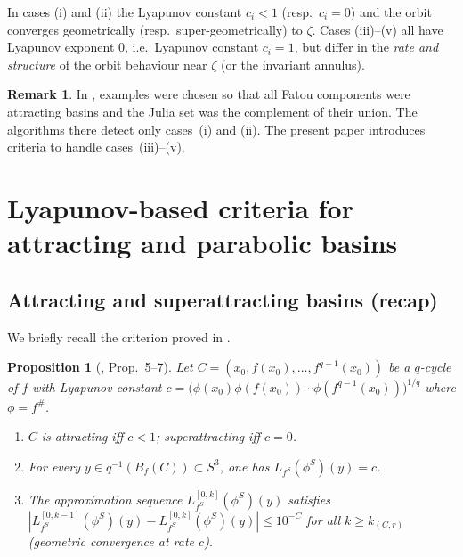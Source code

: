 \documentclass[12pt]{article}
\newtheorem{proposition}[theorem]{Proposition}
\theoremstyle{definition}
\newtheorem{remark}[theorem]{Remark}
\newcommand{\fsh}{f^{\#}}            %
\begin{document}
In cases (i) and (ii) the Lyapunov constant $c_i < 1$ (resp.~$c_i = 0$)
and the orbit converges geometrically (resp.~super-geometrically) to
$\zeta$.  Cases (iii)--(v) all have Lyapunov exponent $0$, i.e.~Lyapunov
constant $c_i = 1$, but differ in the \emph{rate and structure} of the
orbit behaviour near $\zeta$ (or the invariant annulus).

\begin{remark}\label{rem:previous}
  In \cite{Alvarez2023}, examples were chosen so that all Fatou components
  were attracting basins and the Julia set was the complement of their
  union.  The algorithms there detect only cases~(i) and (ii).  The present
  paper introduces criteria to handle cases~(iii)--(v).
\end{remark}

\section{Lyapunov-based criteria for attracting and parabolic basins}
\label{sec:lyapunov}

\subsection{Attracting and superattracting basins (recap)}

We briefly recall the criterion proved in \cite{Alvarez2023}.

\begin{proposition}[\cite{Alvarez2023}, Prop.~5--7]\label{prop:attracting}
  Let $C = (x_0, f(x_0), \ldots, f^{q-1}(x_0))$ be a $q$-cycle of $f$
  with Lyapunov constant
  $c = \bigl(\phi(x_0)\phi(f(x_0))\cdots\phi(f^{q-1}(x_0))\bigr)^{1/q}$
  where $\phi = \fsh$.
  \begin{enumerate}[label=(\roman*)]
    \item $C$ is attracting iff $c < 1$; superattracting iff $c = 0$.
    \item For every $y \in q^{-1}(B_f(C)) \subset S^3$, one has
          $L_{f^S}(\phi^S)(y) = c$.
    \item The approximation sequence $L_{f^S}^{[0,k]}(\phi^S)(y)$
          satisfies $|L_{f^S}^{[0,k-1]}(\phi^S)(y) -
          L_{f^S}^{[0,k]}(\phi^S)(y)| \leq 10^{-C}$
          for all $k \ge k_{(C,r)}$ (geometric convergence at rate $c$).
  \end{enumerate}
\end{proposition}
\end{document}
